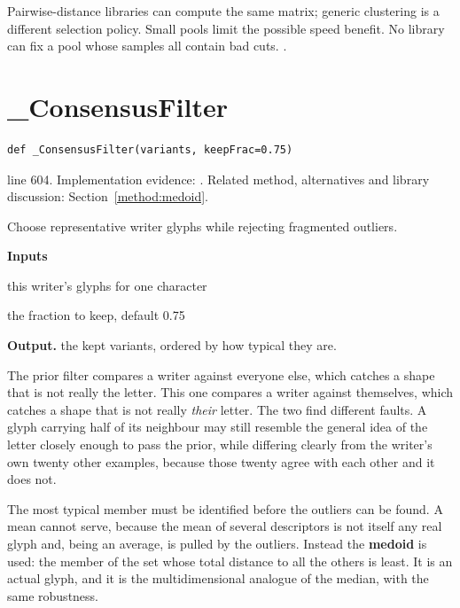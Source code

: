 Pairwise-distance libraries can compute the same matrix; generic clustering is a different selection policy. Small pools limit the possible speed benefit. No library can fix a pool whose samples all contain bad cuts. \cite{code2026,haines2016}.


\section{\_ConsensusFilter}\label{fn:style:-ConsensusFilter}
\begin{lstlisting}[style=sig]
def _ConsensusFilter(variants, keepFrac=0.75)
\end{lstlisting}
 line 604. Implementation evidence: \cite{code2026}. Related method, alternatives and library discussion: Section~\ref{method:medoid}.


Choose representative writer glyphs while rejecting fragmented outliers.




\noindent\textbf{Inputs}
\begin{description}[leftmargin=2.2em,style=nextline,font=\normalfont\ttfamily]\setlength\itemsep{1pt}
  \item[{variants}] \normalfont this writer's glyphs for one character
  \item[{keepFrac}] \normalfont the fraction to keep, default 0.75
\end{description}

\noindent\textbf{Output.} the kept variants, ordered by how typical they are.


The prior filter compares a writer against everyone else, which catches a shape that is not really the letter. This one compares a writer against themselves, which catches a shape that is not really \emph{their} letter. The two find different faults. A glyph carrying half of its neighbour may still resemble the general idea of the letter closely enough to pass the prior, while differing clearly from the writer's own twenty other examples, because those twenty agree with each other and it does not.


The most typical member must be identified before the outliers can be found. A mean cannot serve, because the mean of several descriptors is not itself any real glyph and, being an average, is pulled by the outliers. Instead the \textbf{medoid} is used: the member of the set whose total distance to all the others is least. It is an actual glyph, and it is the multidimensional analogue of the median, with the same robustness.


